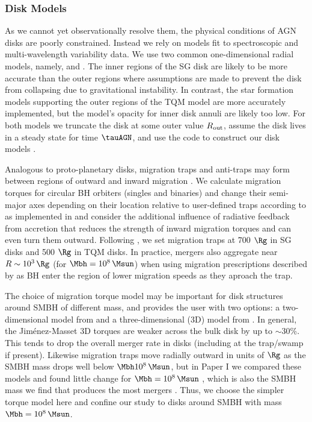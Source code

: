 \subsubsection{Disk Models}
As we cannot yet observationally resolve them, the physical conditions of AGN disks are poorly constrained.
Instead we rely on models fit to spectroscopic and multi-wavelength variability data.
We use two common one-dimensional radial models, namely, \citet[][hereafter SG]{SirkoGoodman03} and \citet[][hereafter TQM]{ThompsonQuataertMurray05}.
The inner regions of the SG disk are likely to be more accurate than the outer regions where assumptions are made to prevent the disk from collapsing due to gravitational instability.
In contrast, the star formation models supporting the outer regions of the TQM model are more accurately implemented, but the model's opacity for inner disk annuli are likely too low.
For both models we truncate the disk at some outer value $R_{\rm out}$, assume the disk lives in a steady state for time $\tauAGN$, and use the  code to construct our disk models \citep{Gangardt+24-pAGN}.

Analogous to proto-planetary disks, migration traps and anti-traps may form between regions of outward and inward migration \citep{Lyra+10}.
We calculate migration torques for circular BH orbiters (singles and binaries) and change their semi-major axes depending on their location relative to user-defined traps according to \citet{Paardekooper+10} as implemented in \citet{GrishinGilbaumStone24} and consider the additional influence of radiative feedback from accretion \citep{HanklaJiangArmitage20} that reduces the strength of inward migration torques and can even turn them outward.
Following \citet{Bellovary+16}, we set migration traps at 700 $\Rg$ in SG disks and 500 $\Rg$ in TQM disks.
In practice, mergers also aggregate near $R\sim10^3\,\Rg$ (for $\Mbh = 10^8\,\Msun$) when using migration prescriptions described by \citet{GrishinGilbaumStone24} as BH enter the region of lower migration speeds as they aproach the trap.

The choice of migration torque model may be important for disk structures around SMBH of different mass, and  provides the user with two options: a two-dimensional model from \citet{Paardekooper+10} and a three-dimensional (3D) model from \citet{JimenezMassset17}.
In general, the Jim\'enez-Masset 3D torques are weaker across the bulk disk by up to $\sim$30\%.
This tends to drop the overall merger rate in disks (including at the trap/swamp if present).
Likewise migration traps move radially outward in units of $\Rg$ as the SMBH mass drops well below $\Mbh 10^8\,\Msun$, but in Paper I we compared these models and found little change for $\Mbh = 10^8\,\Msun$ \citep[see Fig. 6 \& 7 of][]{McKernan+25-mcfactsI}, which is also the SMBH mass we find that produces the most mergers \citep{Delfavero+25}.
Thus, we choose the simpler \citet{Paardekooper+10} torque model here and confine our study to disks around SMBH with mass $\Mbh = 10^8\,\Msun$.

